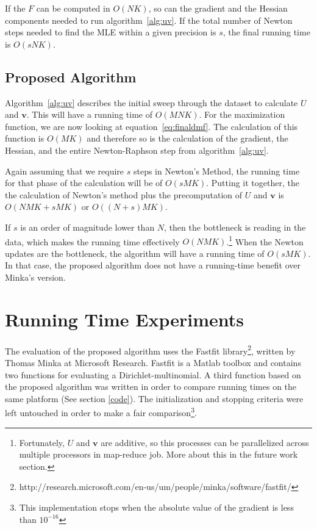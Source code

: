 \documentclass[twoside]{article}
\begin{document}
If the $F$ can be computed in $O(NK)$, so can the gradient and the Hessian components needed to run algorithm~\ref{alg:uv}. If the total number of Newton steps needed to find the MLE within a given precision is $s$, the final running time is $O(sNK)$.
\subsection{Proposed Algorithm}

Algorithm~\ref{alg:uv} describes the initial sweep through the dataset to calculate $U$ and $\mathbf{v}$.  This will have a running time of $O(MNK)$.
For the maximization function, we are now looking at equation~\ref{eq:finaldmf}.  The calculation of this function is $O(MK)$ and therefore so is the calculation of the gradient, the Hessian, and the entire Newton-Raphson step from algorithm~\ref{alg:uv}.

Again assuming that we require $s$ steps in Newton's Method, the running time for that phase of the calculation will be of $O(sMK)$.
Putting it together, the the calculation of Newton's method plus the precomputation of $U$ and $\mathbf{v}$ is $O(NMK + sMK)$ or $O((N+s)MK)$.

If $s$ is an order of magnitude lower than $N$, then the bottleneck is reading in the data, which makes the running time effectively $O(NMK)$.\footnote{Fortunately, $U$ and $\mathbf{v}$ are additive, so this processes can be parallelized across multiple processors in map-reduce job. More about this in the future work section.} When the Newton updates are the bottleneck, the algorithm will have a running time of $O(sMK)$.  In that case, the proposed algorithm does not have a running-time benefit over Minka's version.

\section{Running Time Experiments}
The evaluation of the proposed algorithm uses the Fastfit library\footnote{http://research.microsoft.com/en-us/um/people/minka/software/fastfit/}, written by Thomas Minka at Microsoft Research\cite{minka}.  Fastfit is a Matlab toolbox and contains two functions for evaluating a Dirichlet-multinomial. A third function based on the proposed algorithm was written in order to compare running times on the same platform (See section \ref{code}).  The initialization and stopping criteria were left untouched in order to make a fair comparison\footnote{This implementation stops when the absolute value of the gradient is less than $10^{-16}$}.
\end{document}
